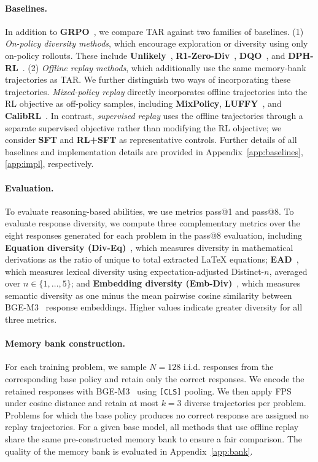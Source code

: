 \documentclass[11pt]{article}
\newcommand{\model}{\textsc{TAR}\xspace}
\begin{document}
\paragraph{Baselines.}
In addition to \textbf{GRPO}~\cite{shao2024deepseekmath}, we compare \model against two families of baselines.
(1) \emph{On-policy diversity methods}, which encourage exploration or diversity using only on-policy rollouts. %
These include \textbf{Unlikely}~\cite{he2025rewarding}, \textbf{R1-Zero-Div}~\cite{yao2025diversity}, \textbf{DQO}~\cite{chen2026posttraining}, and \textbf{DPH-RL}~\cite{li2026divergence}.
(2) \emph{Offline replay methods}, which additionally use the same memory-bank trajectories as \model. We further distinguish two ways of incorporating these trajectories. \emph{Mixed-policy replay} directly incorporates offline trajectories into the RL objective as off-policy samples, including \textbf{MixPolicy}, \textbf{LUFFY}~\cite{luffy}, and \textbf{CalibRL}~\cite{huang2026controllable}.
In contrast, \emph{supervised replay} uses the offline trajectories through a separate supervised objective rather than modifying the RL objective; we consider \textbf{SFT} and \textbf{RL+SFT} as representative controls. 
Further details of all baselines and implementation details are provided in Appendix~\ref{app:baselines}, \ref{app:impl}, respectively.

\paragraph{Evaluation.}
To evaluate reasoning-based abilities, we use metrics pass@1 and pass@8.
To evaluate response diversity, we compute three complementary metrics over the eight responses generated for each problem in the pass@8 evaluation, including 
\textbf{Equation diversity (Div-Eq)}~\cite{wu2025progress}, which measures diversity in mathematical derivations as the ratio of unique to total extracted LaTeX equations; 
\textbf{EAD}~\cite{liu2022rethinking}, which measures lexical diversity using expectation-adjusted Distinct-$n$, averaged over $n\in\{1,\ldots,5\}$; 
and \textbf{Embedding diversity (Emb-Div)}~\cite{reimers2019sentencebert}, which measures semantic diversity as one minus the mean pairwise cosine similarity between BGE-M3~\cite{chen2024bge} response embeddings.
Higher values indicate greater diversity for all three metrics.

\paragraph{Memory bank construction.}
For each training problem, we sample $N=128$ i.i.d. responses from the corresponding base policy and retain only the correct responses.
We encode the retained responses with BGE-M3~\cite{chen2024bge} using \texttt{[CLS]} pooling.
We then apply FPS under cosine distance and retain at most $k=3$ diverse trajectories per problem.
Problems for which the base policy produces no correct response are assigned no replay trajectories.
For a given base model, all methods that use offline replay share the same pre-constructed memory bank to ensure a fair comparison. The quality of the memory bank is evaluated in Appendix~\ref{app:bank}.
\end{document}
